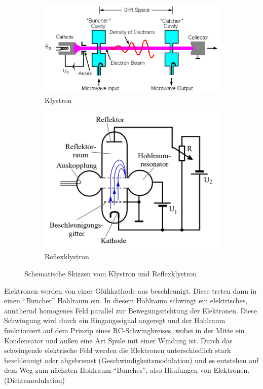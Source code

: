 \begin{figure}
    \centering
    \begin{subfigure}{0.45\textwidth}
        \centering
        \includegraphics[width=\textwidth]{images/klystron.png}
        \caption{Klystron}
        \label{fig:klystron}
    \end{subfigure}
    \begin{subfigure}{0.45\textwidth}
        \centering
        \includegraphics[width=\textwidth]{images/reflexklystron.png}
        \caption{Reflexklystron}
        \label{fig:reflexklystron}
    \end{subfigure}
    \caption{Schematische Skizzen vom Klystron und Reflexklystron \cite{wiki_klystron}}
    \label{fig:wiki_klystron}
\end{figure}

Elektronen werden von einer Glühkathode aus beschleunigt. 
Diese treten dann in einen \enquote{Buncher} Hohlraum ein.
In diesem Hohlraum schwingt ein elektrisches, annähernd homogenes Feld parallel zur Bewegungsrichtung der Elektronen.
Diese Schwingung wird durch ein Eingangssignal angeregt und der Hohlraum funktioniert auf dem Prinzip eines RC-Schwingkreises,
wobei in der Mitte ein Kondensator und außen eine Art Spule mit einer Windung ist.
Durch das schwingende elektrische Feld werden die Elektronen unterschiedlich stark beschleunigt oder abgebremst (Geschwindigkeitsmodulation)
und es entstehen auf dem Weg zum nächsten Hohlraum \enquote{Bunches}, also Häufungen von Elektronen. (Dichtemodulation)

